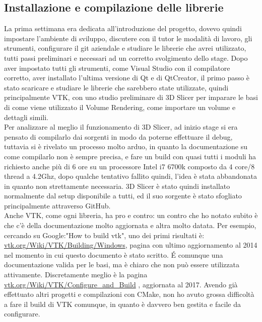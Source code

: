 \subsection{Installazione e compilazione delle librerie}
La prima settimana era dedicata all'introduzione del progetto, dovevo quindi impostare l'ambiente di sviluppo, discutere con il tutor le modalità di lavoro, gli strumenti, configurare il git aziendale e studiare le librerie che avrei utilizzato, tutti passi preliminari e necessari ad un corretto svolgimento dello stage.
Dopo aver impostato tutti gli strumenti, come Visual Studio con il compilatore corretto, aver installato l'ultima versione di Qt e di QtCreator, il primo passo è stato scaricare e studiare le librerie che sarebbero state utilizzate, quindi principalmente VTK, con uno studio preliminare di 3D Slicer per imparare le basi di come viene utilizzato il Volume Rendering, come importare un volume e dettagli simili. 
\\
Per analizzare al meglio il funzionamento di 3D Slicer, ad inizio stage si era pensato di compilarlo dai sorgenti in modo da poterne effettuare il debug, tuttavia si è rivelato un processo molto arduo, in quanto la documentazione su come compilarlo non è sempre precisa, e fare un build con quasi tutti i moduli ha richiesto anche più di 6 ore su un processore Intel i7 6700k composto da 4 core/8 thread a 4.2Ghz, dopo qualche tentativo fallito quindi, l'idea è stata abbandonata in quanto non strettamente necessaria. 3D Slicer è stato quindi installato normalmente dal setup disponibile a tutti, ed il suo sorgente è stato sfogliato principalmente attraverso GitHub.
\\
Anche VTK, come ogni libreria, ha pro e contro: un contro che ho notato subito è che c'è della documentazione molto aggiornata e altra molto datata. Per esempio, cercando su Google:"How to build vtk", uno dei primi risultati è: \href{https://vtk.org/Wiki/VTK/Building/Windows}{vtk.org/Wiki/VTK/Building/Windows}, pagina con ultimo aggiornamento al 2014 nel momento in cui questo documento è stato scritto. \'E comunque una documentazione valida per le basi, ma è chiaro che non può essere utilizzata attivamente. Discretamente meglio è la pagina \href{https://vtk.org/Wiki/VTK/Configure_and_Build}{vtk.org/Wiki/VTK/Configure\_and\_Build} , aggiornata al 2017. Avendo già effettuato altri progetti e compilazioni con CMake, non ho avuto grossa difficoltà a fare il build di VTK comunque, in quanto è davvero ben gestita e facile da configurare.

